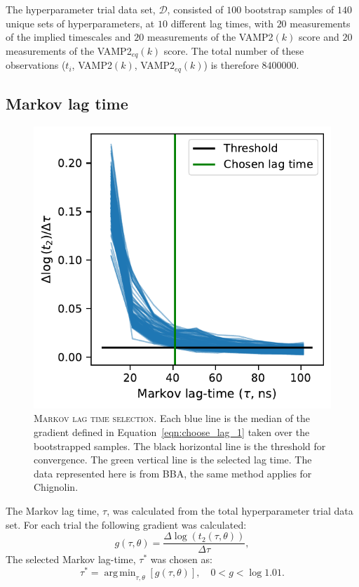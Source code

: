 \documentclass[journal=jacsat,manuscript=article]{achemso}
\DeclareMathOperator*{\argmin}{arg\,min}
\begin{document}
The hyperparameter trial data set, $\mathcal{D}$, consisted of $100$ bootstrap samples of $140$  unique sets of hyperparameters, at $10$ different lag times, with  $20$ measurements of the implied timescales and $20$ measurements of the VAMP2$(k)$ score and $20$ measurements of the VAMP2$_{eq}(k)$ score. The total number of these observations ($t_i$, VAMP2$(k)$, VAMP2$_{eq}(k)$) is therefore $\num{8400000}$. 

\subsection{Markov lag time}
\begin{figure}
    \centering
    \includegraphics{figures/timescale_selection.pdf}
    \caption{\textsc{Markov lag time selection}. Each blue line is the median of the gradient defined in Equation~\ref{eqn:choose_lag_1} taken over the bootstrapped samples. The black horizontal line is the threshold for convergence.  The green vertical line is the selected lag time. The data represented here is from BBA, the same method applies for Chignolin.}
    \label{fig:lag_selection}
\end{figure}

The Markov lag time, $\tau$, was calculated from the total hyperparameter trial data set. For each trial the following gradient was calculated:
\begin{equation}
    g(\tau, \theta) = \frac{\Delta \log{\left(t_{2}(\tau, \theta)\right)}}{\Delta \tau}, \label{eqn:choose_lag_1}
\end{equation}
The selected Markov lag-time, $\tau^{*}$ was chosen as:
\begin{equation}
    \tau^{*}  = \argmin_{\tau, \theta}\left[g(\tau, \theta)\right], \quad 0 < g < \log{1.01}. \label{eqn:choose_lag_2}
\end{equation}
\end{document}

